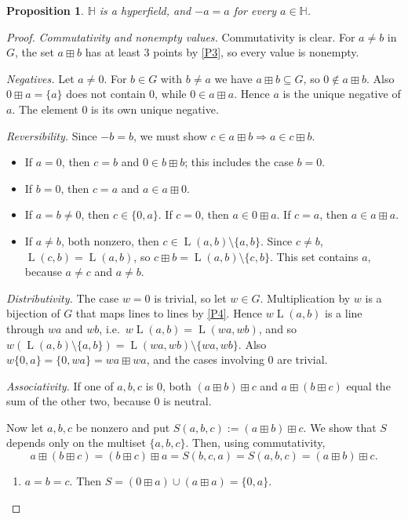 \documentclass[11pt]{article}
\newtheorem{proposition}[theorem]{Proposition}
\theoremstyle{definition}
\theoremstyle{remark}
\newcommand{\HH}{\mathbb{H}}
\newcommand{\bp}{\boxplus}
\DeclareMathOperator{\Ln}{L}
\begin{document}
\begin{proposition}\label{prop:hyperfield}
$\HH$ is a hyperfield, and $-a=a$ for every $a\in\HH$.
\end{proposition}
\begin{proof}
\emph{Commutativity and nonempty values.} Commutativity is clear. For $a\neq b$ in $G$, the set $a\bp b$ has at least $3$ points by \ref{P3}, so every value is nonempty.

\emph{Negatives.} Let $a\neq0$. For $b\in G$ with $b\neq a$ we have $a\bp b\subseteq G$, so $0\notin a\bp b$. Also $0\bp a=\{a\}$ does not contain $0$, while $0\in a\bp a$. Hence $a$ is the unique negative of $a$. The element $0$ is its own unique negative.

\emph{Reversibility.} Since $-b=b$, we must show $c\in a\bp b\Rightarrow a\in c\bp b$.
\begin{itemize}[nosep]
\item If $a=0$, then $c=b$ and $0\in b\bp b$; this includes the case $b=0$.
\item If $b=0$, then $c=a$ and $a\in a\bp 0$.
\item If $a=b\neq0$, then $c\in\{0,a\}$. If $c=0$, then $a\in 0\bp a$. If $c=a$, then $a\in a\bp a$.
\item If $a\neq b$, both nonzero, then $c\in\Ln(a,b)\setminus\{a,b\}$. Since $c\neq b$, $\Ln(c,b)=\Ln(a,b)$, so $c\bp b=\Ln(a,b)\setminus\{c,b\}$. This set contains $a$, because $a\neq c$ and $a\neq b$.
\end{itemize}

\emph{Distributivity.} The case $w=0$ is trivial, so let $w\in G$. Multiplication by $w$ is a bijection of $G$ that maps lines to lines by \ref{P4}. Hence $w\Ln(a,b)$ is a line through $wa$ and $wb$, i.e.\ $w\Ln(a,b)=\Ln(wa,wb)$, and so $w(\Ln(a,b)\setminus\{a,b\})=\Ln(wa,wb)\setminus\{wa,wb\}$. Also $w\{0,a\}=\{0,wa\}=wa\bp wa$, and the cases involving $0$ are trivial.

\emph{Associativity.} If one of $a,b,c$ is $0$, both $(a\bp b)\bp c$ and $a\bp(b\bp c)$ equal the sum of the other two, because $0$ is neutral.

Now let $a,b,c$ be nonzero and put $S(a,b,c):=(a\bp b)\bp c$. We show that $S$ depends only on the multiset $\{a,b,c\}$. Then, using commutativity,
\[
a\bp(b\bp c)=(b\bp c)\bp a=S(b,c,a)=S(a,b,c)=(a\bp b)\bp c.
\]
\begin{enumerate}[label=\textup{Case \arabic*.},ref=\arabic*,leftmargin=*]
\item\label{case1} $a=b=c$. Then $S=(0\bp a)\cup(a\bp a)=\{0,a\}$.


\end{enumerate}
\end{proof}
\end{document}
